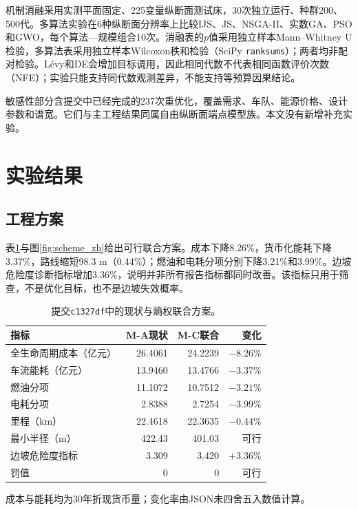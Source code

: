 \documentclass[preprint,12pt]{elsarticle}
\begin{document}
机制消融采用实测平面固定、225变量纵断面测试床，30次独立运行、种群200、500代。多算法实验在6种纵断面分辨率上比较IJS、JS、NSGA-II、实数GA、PSO和GWO，每个算法—规模组合10次。消融表的$p$值采用独立样本Mann--Whitney U检验，多算法表采用独立样本Wilcoxon秩和检验（SciPy \texttt{ranksums}）；两者均非配对检验。L\'evy和DE会增加目标调用，因此相同代数不代表相同函数评价次数（NFE）；实验只能支持同代数观测差异，不能支持等预算因果结论。

敏感性部分含提交中已经完成的237次重优化，覆盖需求、车队、能源价格、设计参数和谱宽。它们与主工程结果同属自由纵断面端点模型族。本文没有新增补充实验。

\section{实验结果}

\subsection{工程方案}

表\ref{tab:main_zh}与图\ref{fig:scheme_zh}给出可行联合方案。成本下降8.26\%，货币化能耗下降3.37\%，路线缩短98.3 m（0.44\%）；燃油和电耗分项分别下降3.21\%和3.99\%。边坡危险度诊断指标增加3.36\%，说明并非所有报告指标都同时改善。该指标只用于筛查，不是优化目标，也不是边坡失效概率。

\begin{table}[t]
\centering
\caption{提交\texttt{c1327df}中的现状与熵权联合方案。}
\label{tab:main_zh}
\begin{threeparttable}
\begin{tabular}{lrrr}
\toprule
指标 & M-A现状 & M-C联合 & 变化 \\
\midrule
全生命周期成本（亿元） & 26.4061 & 24.2239 & $-8.26\%$ \\
车流能耗（亿元） & 13.9460 & 13.4766 & $-3.37\%$ \\
\quad 燃油分项 & 11.1072 & 10.7512 & $-3.21\%$ \\
\quad 电耗分项 & 2.8388 & 2.7254 & $-3.99\%$ \\
里程（km） & 22.4618 & 22.3635 & $-0.44\%$ \\
最小半径（m） & 422.43 & 401.03 & 可行 \\
边坡危险度指标 & 3.309 & 3.420 & $+3.36\%$ \\
罚值 & 0 & 0 & 可行 \\
\bottomrule
\end{tabular}
\begin{tablenotes}\footnotesize
\item 成本与能耗均为30年折现货币量；变化率由JSON未四舍五入数值计算。
\end{tablenotes}
\end{threeparttable}
\end{table}
\end{document}
